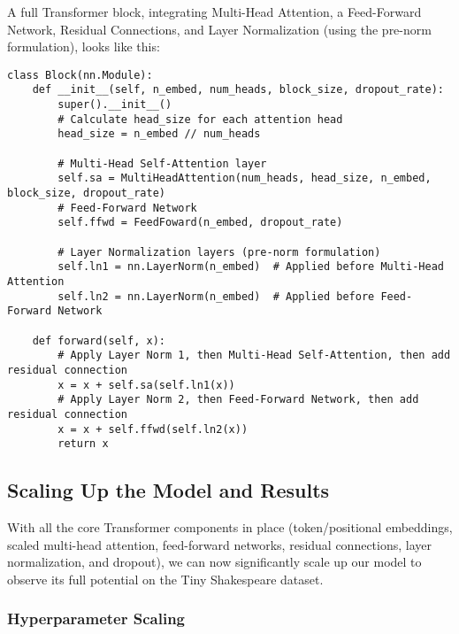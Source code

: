 A full Transformer block, integrating Multi-Head Attention, a Feed-Forward Network, Residual Connections, and Layer Normalization (using the pre-norm formulation), looks like this:

\begin{lstlisting}[caption={Transformer Block implementation (\texttt{Block} class)}]
class Block(nn.Module):
    def __init__(self, n_embed, num_heads, block_size, dropout_rate):
        super().__init__()
        # Calculate head_size for each attention head
        head_size = n_embed // num_heads 
        
        # Multi-Head Self-Attention layer
        self.sa = MultiHeadAttention(num_heads, head_size, n_embed, block_size, dropout_rate)
        # Feed-Forward Network
        self.ffwd = FeedFoward(n_embed, dropout_rate)
        
        # Layer Normalization layers (pre-norm formulation)
        self.ln1 = nn.LayerNorm(n_embed)  # Applied before Multi-Head Attention
        self.ln2 = nn.LayerNorm(n_embed)  # Applied before Feed-Forward Network

    def forward(self, x):
        # Apply Layer Norm 1, then Multi-Head Self-Attention, then add residual connection
        x = x + self.sa(self.ln1(x)) 
        # Apply Layer Norm 2, then Feed-Forward Network, then add residual connection
        x = x + self.ffwd(self.ln2(x)) 
        return x
\end{lstlisting}

\subsection{Scaling Up the Model and Results}

With all the core Transformer components in place (token/positional embeddings, scaled multi-head attention, feed-forward networks, residual connections, layer normalization, and dropout), we can now significantly scale up our model to observe its full potential on the Tiny Shakespeare dataset.

\subsubsection{Hyperparameter Scaling}

